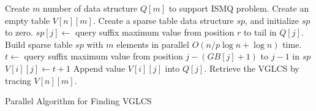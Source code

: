 \begin{algorithm}
\SetAlgoNoLine
{}
    
Create $m$ number of data structure $Q[m]$ to support ISMQ problem.\;
Create an empty table $V[n][m]$. \;
 {
  Create a sparse table data structure $\textit{sp}$, and initialize $\textit{sp}$ to zero. \;
   {
    $\textit{sp}[j] \gets$ query suffix maximum value from position $r$ to tail in $Q[j]$. \;
  }
  Build sparse table $\textit{sp}$ with $m$ elements in parallel $O(n/p \log n + \log n)$ time. \;
   {
     {
        $t \gets $ query suffix maximum value from position $j - (GB[j] + 1)$ to $j-1$ in $\textit{sp}$ \;
        $V[i][j] \gets t + 1$ \;
        Append value $V[i][j]$ into $Q[j]$. \;
    }
  }
}
Retrieve the VGLCS by tracing $V[n][m]$. \;

  \caption{Parallel Algorithm for Finding VGLCS}
  \label{alg:parallel-VGLCS}
\end{algorithm}